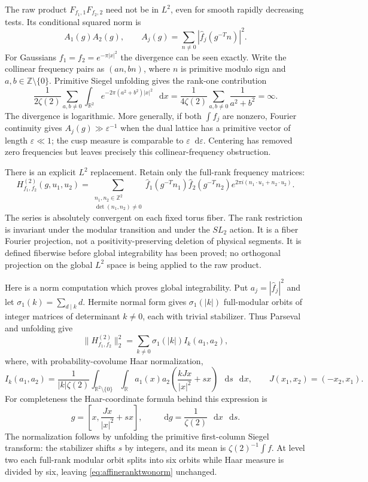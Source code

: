 \documentclass[11pt,a4paper]{article}
\numberwithin{equation}{section}
\theoremstyle{definition}
\theoremstyle{remark}
\newcommand{\dd}{\mathop{}\!\mathrm d}
\newcommand{\RR}{\mathbb R}
\newcommand{\ZZ}{\mathbb Z}
\begin{document}
The raw product $F_{f_1,1}F_{f_2,2}$ need not be in $L^2$, even for
smooth rapidly decreasing tests. Its conditional squared norm is
\[
 A_1(g)A_2(g),\qquad
 A_j(g)=\sum_{n\ne0}|\widehat f_j(g^{-T}n)|^2.
\]
For Gaussians $f_1=f_2=e^{-\pi|x|^2}$ the divergence can be seen
exactly. Write the collinear frequency pairs as $(an,bn)$, where
$n$ is primitive modulo sign and $a,b\in\ZZ\setminus\{0\}$.
Primitive Siegel unfolding gives the rank-one contribution
\[
 \frac1{2\zeta(2)}\sum_{a,b\ne0}
       \int_{\RR^2}e^{-2\pi(a^2+b^2)|x|^2}\,\dd x
 =\frac1{4\zeta(2)}\sum_{a,b\ne0}\frac1{a^2+b^2}
 =\infty.
\]
The divergence is logarithmic. More generally, if both $\int f_j$ are
nonzero, Fourier continuity gives $A_j(g)\gg\varepsilon^{-1}$ when
the dual lattice has a primitive vector of length $\varepsilon\ll1$;
the cusp measure is comparable to $\varepsilon\dd\varepsilon$.
Centering has removed zero frequencies but leaves precisely this
collinear-frequency obstruction.

There is an explicit $L^2$ replacement. Retain only the full-rank
frequency matrices:
\begin{equation}
 H_{f_1,f_2}^{(2)}(g,u_1,u_2)
 =\sum_{\substack{n_1,n_2\in\ZZ^2\\\det(n_1,n_2)\ne0}}
 \widehat f_1(g^{-T}n_1)\widehat f_2(g^{-T}n_2)
 e^{2\pi i(n_1\cdot u_1+n_2\cdot u_2)}.
 \label{eq:affineranktwoobservable}
\end{equation}
The series is absolutely convergent on each fixed torus fiber.
The rank restriction is invariant under the modular transition and
under the $SL_2$ action. It is a fiber Fourier projection, not a
positivity-preserving deletion of physical segments. It is defined
fiberwise before global integrability has been proved; no orthogonal
projection on the global $L^2$ space is being applied to the raw product.

Here is a norm computation which proves global integrability. Put
$a_j=|\widehat f_j|^2$ and let $\sigma_1(k)=\sum_{d\mid k}d$.
Hermite normal form gives $\sigma_1(|k|)$ full-modular orbits of
integer matrices of determinant $k\ne0$, each with trivial stabilizer.
Thus Parseval and unfolding give
\begin{equation}
 \|H_{f_1,f_2}^{(2)}\|_2^2
 =\sum_{k\ne0}\sigma_1(|k|)I_k(a_1,a_2),
 \label{eq:affineranktwonorm}
\end{equation}
where, with probability-covolume Haar normalization,
\[
 I_k(a_1,a_2)
 =\frac1{|k|\zeta(2)}
  \int_{\RR^2\setminus\{0\}}\int_\RR
  a_1(x)a_2\left(\frac{kJx}{|x|^2}+sx\right)
  \,\dd s\,\dd x,
 \qquad J(x_1,x_2)=(-x_2,x_1).
\]
For completeness the Haar-coordinate formula behind this expression is
\[
 g=\left[x,\frac{Jx}{|x|^2}+sx\right],\qquad
 \dd g=\frac1{\zeta(2)}\,\dd x\,\dd s.
\]
The normalization follows by unfolding the primitive first-column
Siegel transform: the stabilizer shifts $s$ by integers, and its mean
is $\zeta(2)^{-1}\int f$. At level two each full-rank modular orbit
splits into six orbits while Haar measure is divided by six, leaving
\eqref{eq:affineranktwonorm} unchanged.
\end{document}
